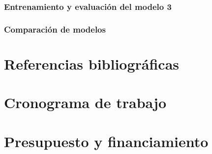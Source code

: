 \documentclass{article}
\theoremstyle{mytheoremstyle}
\theoremstyle{mytheoremstyle}
\theoremstyle{myproblemstyle}
\begin{document}
    \subsubsection{Entrenamiento y evaluación del modelo 3}
    \subsubsection{Comparación de modelos}

    

    \section{Referencias bibliográficas}
    \printbibliography

    \section{Cronograma de trabajo}

    \section{Presupuesto y financiamiento}
\end{document}
